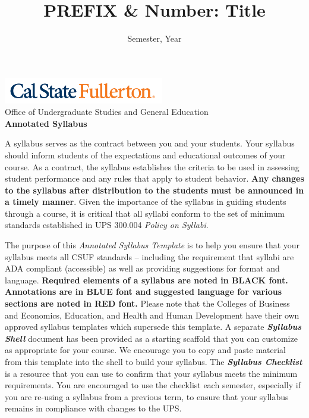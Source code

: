 \documentclass[12pt]{article} %
\title{PREFIX \& Number: Title} %
\author{} %
\date{Semester, Year} %
\begin{document}
\begin{center}
\includegraphics[width=2.75in, alt={Cal State Fullerton wordmark}]{csuf_logo.png}\\
\vspace{0.5em}
{\large Office of Undergraduate Studies and General Education}\\
\vspace{1em}
{\Large \textbf{Annotated Syllabus}}
\end{center}

\vspace{1em}
\noindent A syllabus serves as the contract between you and your students. Your syllabus should inform students of the expectations and educational outcomes of your course. As a contract, the syllabus establishes the criteria to be used in assessing student performance and any rules that apply to student behavior. \textbf{Any changes to the syllabus after distribution to the students must be announced in a timely manner}. Given the importance of the syllabus in guiding students through a course, it is critical that all syllabi conform to the set of minimum standards established in UPS 300.004 \textit{Policy on Syllabi}.

\vspace{1em}

\noindent The purpose of this \textit{Annotated Syllabus Template} is to help you ensure that your syllabus meets all CSUF standards -- including the requirement that syllabi are ADA compliant (accessible) as well as providing suggestions for format and language. \textbf{Required elements of a syllabus are noted in BLACK font. Annotations are in BLUE font and suggested language for various sections are noted in RED font.} Please note that the Colleges of Business and Economics, Education, and Health and Human Development have their own approved syllabus templates which supersede this template. A separate \textbf{\textit{Syllabus Shell}} document has been provided as a starting scaffold that you can customize as appropriate for your course. We encourage you to copy and paste material from this template into the shell to build your syllabus. The \textbf{\textit{Syllabus Checklist}} is a resource that you can use to confirm that your syllabus meets the minimum requirements. You are encouraged to use the checklist each semester, especially if you are re-using a syllabus from a previous term, to ensure that your syllabus remains in compliance with changes to the UPS.
\end{document}
